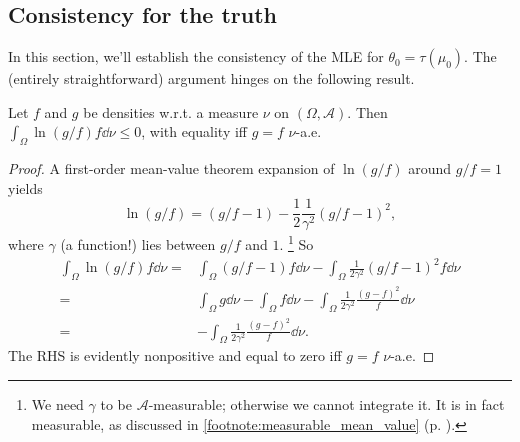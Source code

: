 \documentclass[11pt,letterpaper,reqno,oneside]{article}
\begin{document}
\subsection{Consistency for the truth}
\label{sec:MLE:consistency_for_truth}

In this section, we'll establish the consistency of the MLE for $\theta_0 = \tau(\mu_0)$. The (entirely straightforward) argument hinges on the following result.


\begin{proposition}
	Let $f$ and $g$ be densities w.r.t. a measure $\nu$ on $(\Omega,\mathcal{A})$. Then $\int_\Omega \ln(g/f) f \dd\nu \leq 0$, with equality iff $g=f$ $\nu$-a.e.
\end{proposition}


\begin{proof}
	A first-order mean-value theorem expansion of $\ln(g/f)$ around $g/f=1$ yields
	\begin{equation*}
		\ln(g/f) = (g/f-1) - \frac{1}{2} \frac{1}{\gamma^2} (g/f-1)^2 ,
	\end{equation*}
	where $\gamma$ (a function!) lies between $g/f$ and $1$.%
		\footnote{We need $\gamma$ to be $\mathcal{A}$-measurable; otherwise we cannot integrate it. It is in fact measurable, as discussed in \cref{footnote:measurable_mean_value} (p. \pageref{footnote:measurable_mean_value}).}
	So
	\begin{align*}
		\int_\Omega \ln(g/f) f \dd \nu
		={}& \int_\Omega (g/f-1) f \dd \nu 
		- \int_\Omega \frac{1}{2\gamma^2} (g/f-1)^2 f \dd \nu 
		\\
		={}& \int_\Omega g \dd \nu
		- \int_\Omega f \dd \nu  
		- \int_\Omega \frac{1}{2\gamma^2} \frac{(g-f)^2}{ f } \dd \nu 
		\\
		={}& - \int_\Omega \frac{1}{2\gamma^2} \frac{(g-f)^2}{ f } \dd \nu .
	\end{align*}	
	The RHS is evidently nonpositive and equal to zero iff $g=f$ $\nu$-a.e.
\end{proof}
\end{document}
